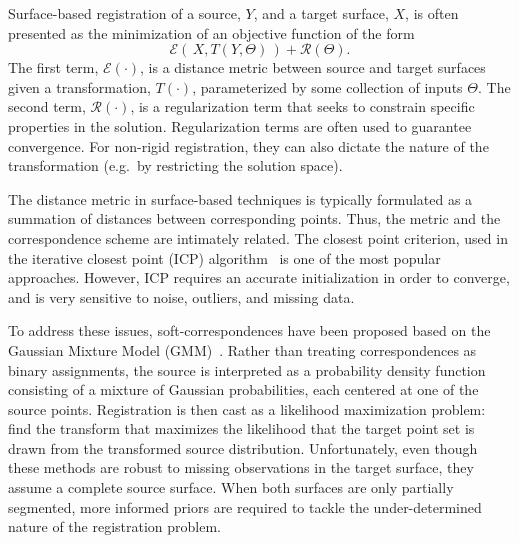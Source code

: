 \documentclass[journal]{IEEEtran}
\begin{document}
Surface-based registration of a source, $Y$, and a target surface, $X$, is often presented as the minimization of an objective function of the form
\begin{equation} \label{eq:SurfReg}
\mathcal{E}\left(\,X,T(Y,\Theta)\,\right)+\mathcal{R}(\Theta).
\end{equation}
The first term, $\mathcal{E}(\cdot)$, is a distance metric between source and target surfaces given a transformation, $T(\cdot)$, parameterized by some collection of inputs $\Theta$. The second term, $\mathcal{R}(\cdot)$, is a regularization term that seeks to constrain specific properties in the solution. Regularization terms are often used to guarantee convergence.  For non-rigid registration, they can also dictate the nature of the transformation (e.g.~by restricting the solution space).

The distance metric in surface-based techniques is typically formulated as a summation of distances between corresponding points. Thus, the metric and the correspondence scheme are intimately related. The closest point criterion, used in the iterative closest point (ICP) algorithm~\cite{Besl92a,Zhang94a} is one of the most popular approaches. However, ICP requires an accurate initialization in order to converge, and is very sensitive to noise, outliers, and missing data. 

To address these issues, soft-correspondences have been proposed based on the Gaussian Mixture Model (GMM)~\cite{Chui03a,Wang08a,Jian11a,Myronenko10a,Horaud11a}. Rather than treating correspondences as binary assignments, the source is interpreted as a probability density function consisting of a mixture of Gaussian probabilities, each centered at one of the source points.  Registration is then cast as a likelihood maximization problem: find the transform that maximizes the likelihood that the target point set is drawn from the transformed source distribution.  Unfortunately, even though these methods are robust to missing observations in the target surface, they assume a complete source surface.  When both surfaces are only partially segmented, more informed priors are required to tackle the under-determined nature of the registration problem. 
\end{document}

